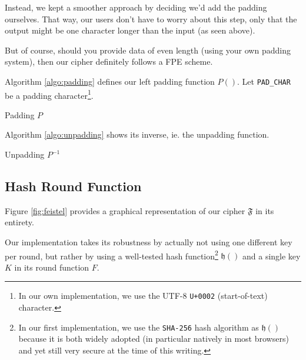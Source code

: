 \documentclass[twoside,twocolumn]{article}
\newcommand{\mod}[1]{\ \mathrm{mod}\ #1}
\theoremstyle{definition}
\theoremstyle{remark}
\begin{document}
Instead, we kept a smoother approach by deciding we'd add the padding ourselves. That way, our users don't have to worry about this step, only that 
the output might be one character longer than the input (as seen above).

But of course, should you provide data of even length (using your own padding system), then our cipher definitely follows a FPE scheme.

Algorithm \ref{algo:padding} defines our left padding function $P()$.
Let \texttt{PAD\_CHAR} be a padding character\footnote{In our own implementation, we use the UTF-8 \texttt{U+0002} (start-of-text) character.}.
\begin{algorithm}
    \eIf{$|m| \mod 2 = 0$}{
        \Return{$m$}
    }{
        \Return{\emph{\texttt{PAD\_CHAR}} $\mathbin\Vert m$}
    }
    \caption{Padding $P$}
    \label{algo:padding}
\end{algorithm}

Algorithm \ref{algo:unpadding} shows its inverse, ie. the unpadding function.

\begin{algorithm}
    \caption{Unpadding $P^{-1}$}
    \label{algo:unpadding}
\end{algorithm}

\subsection{Hash Round Function}
\label{roundFunction}

Figure \ref{fig:feistel} provides a graphical representation of our cipher $\mathfrak{F}$ in its entirety.

Our implementation takes its robustness by actually not using one different key per round, but rather by using a well-tested hash function\footnote{
    In our first implementation, we use the \texttt{SHA-256} hash algorithm as $\mathfrak{h}()$ because it is both widely adopted (in particular 
    natively in most browsers) and yet still very secure at the time of this writing.
} $\mathfrak{h}()$ and a single key $K$ in its round function $F$.
\end{document}
